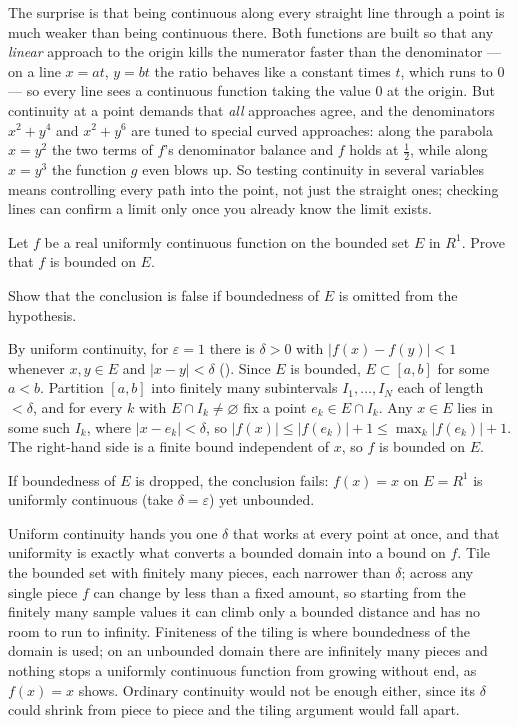 \documentclass[main.tex]{subfiles}
\begin{document}
\begin{Reflection}
The surprise is that being continuous along every straight line through a point is much weaker than being continuous there. Both functions are built so that any \emph{linear} approach to the origin kills the numerator faster than the denominator --- on a line $x = at$, $y = bt$ the ratio behaves like a constant times $t$, which runs to $0$ --- so every line sees a continuous function taking the value $0$ at the origin. But continuity at a point demands that \emph{all} approaches agree, and the denominators $x^{2} + y^{4}$ and $x^{2} + y^{6}$ are tuned to special curved approaches: along the parabola $x = y^{2}$ the two terms of $f$'s denominator balance and $f$ holds at $\tfrac{1}{2}$, while along $x = y^{3}$ the function $g$ even blows up. So testing continuity in several variables means controlling every path into the point, not just the straight ones; checking lines can confirm a limit only once you already know the limit exists.
\end{Reflection}

Let $f$ be a real uniformly continuous function on the bounded set $E$ in $R^{1}$. Prove that $f$ is bounded on $E$.

Show that the conclusion is false if boundedness of $E$ is omitted from the hypothesis.
\begin{SolutionBlue}
By uniform continuity, for $\varepsilon = 1$ there is $\delta > 0$ with $|f(x) - f(y)| < 1$ whenever $x, y \in E$ and $|x - y| < \delta$ (). Since $E$ is bounded, $E \subset [a, b]$ for some $a < b$. Partition $[a, b]$ into finitely many subintervals $I_{1}, \dots, I_{N}$ each of length $< \delta$, and for every $k$ with $E \cap I_{k} \ne \varnothing$ fix a point $e_{k} \in E \cap I_{k}$. Any $x \in E$ lies in some such $I_{k}$, where $|x - e_{k}| < \delta$, so $|f(x)| \le |f(e_{k})| + 1 \le \max_{k} |f(e_{k})| + 1$. The right-hand side is a finite bound independent of $x$, so $f$ is bounded on $E$.

If boundedness of $E$ is dropped, the conclusion fails: $f(x) = x$ on $E = R^{1}$ is uniformly continuous (take $\delta = \varepsilon$) yet unbounded.
\end{SolutionBlue}
\begin{Reflection}
Uniform continuity hands you one $\delta$ that works at every point at once, and that uniformity is exactly what converts a bounded domain into a bound on $f$. Tile the bounded set with finitely many pieces, each narrower than $\delta$; across any single piece $f$ can change by less than a fixed amount, so starting from the finitely many sample values it can climb only a bounded distance and has no room to run to infinity. Finiteness of the tiling is where boundedness of the domain is used; on an unbounded domain there are infinitely many pieces and nothing stops a uniformly continuous function from growing without end, as $f(x) = x$ shows. Ordinary continuity would not be enough either, since its $\delta$ could shrink from piece to piece and the tiling argument would fall apart.
\end{Reflection}
\end{document}
